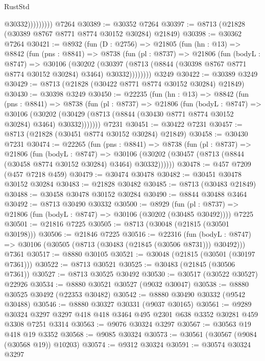 \begin{lexlean}{RustStd}
\begin{coremodule}
                      @30332)))))))))
    @7264
@30389 := @30352 @7264
@30397 := @8713 (@21828 (@30389 @8767 @8771 @8774 @30152 @30284) @21849)
@30398 := @30362 @7264
@30421 := @8932
    (fun (D : @2756) =>
    @21805
      (fun (hn : @13) =>
      @8842
        (fun (pns : @8841) =>
        @8738
          (fun (pl : @8737) =>
          @21806
            (fun (bodyL : @8747) =>
            @30106
              (@30202
                (@30397 (@8713 (@8844 (@30398 @8767 @8771 @8774 @30152 @30284) @3464) @30332))))))))
    @3249
@30422 := @30389 @3249
@30429 := @8713 (@21828 (@30422 @8771 @8774 @30152 @30284) @21849)
@30430 := @30398 @3249
@30450 := @22235
    (fun (hn : @13) =>
    @8842
      (fun (pns : @8841) =>
      @8738
        (fun (pl : @8737) =>
        @21806
          (fun (bodyL : @8747) =>
          @30106
            (@30202 (@30429 (@8713 (@8844 (@30430 @8771 @8774 @30152 @30284) @3464) @30332)))))))
    @7231
@30451 := @30422 @7231
@30457 := @8713 (@21828 (@30451 @8774 @30152 @30284) @21849)
@30458 := @30430 @7231
@30474 := @22265
    (fun (pns : @8841) =>
    @8738
      (fun (pl : @8737) =>
      @21806
        (fun (bodyL : @8747) =>
        @30106 (@30202 (@30457 (@8713 (@8844 (@30458 @8774 @30152 @30284) @3464) @30332))))))
@30478 := @457 @7209 (@457 @7218 @459)
@30479 := @30474 @30478
@30482 := @30451 @30478 @30152 @30284
@30483 := @21828 @30482
@30485 := @8713 (@30483 @21849)
@30488 := @30458 @30478 @30152 @30284
@30490 := @8844 @30488 @3464
@30492 := @8713 @30490 @30332
@30500 := @8929
    (fun (pl : @8737) => @21806 (fun (bodyL : @8747) => @30106 (@30202 (@30485 @30492))))
    @7225
@30501 := @21816 @7225
@30505 := @8713 (@30048 (@21815 (@30501 @30198)))
@30506 := @21846 @7225
@30516 := @22316
    (fun (bodyL : @8747) => @30106 (@30505 (@8713 (@30483 (@21845 (@30506 @8731))) @30492)))
    @7361
@30517 := @8880 @30105
@30521 := @30048 (@21815 (@30501 (@30197 @7361)))
@30522 := @8713 @30521
@30525 := @30483 (@21845 (@30506 @7361))
@30527 := @8713 @30525 @30492
@30530 := @30517 (@30522 @30527) @22926
@30534 := @8880 @30521 @30527 (@9032 @30047)
@30538 := @8880 @30525 @30492 (@22353 @30482)
@30542 := @8880 @30490 @30332 (@9542 @30488)
@30546 := @8880 @30327 @30331 (@9037 @30165)
@30561 := @9289
    @30324
    @3297
    @3297
    @418
    @418
    @3464
    @495
    @2301
    @638
    @3352
    @30281
    @459
    @3308
    @7251
    @3314
@30563 := @9076 @30324 @3297
@30567 := @30563 @19 @418 @19 @3352
@30568 := @9085 @30324
@30573 := @30561 (@30567 (@9084 (@30568 @19)) @10203)
@30574 := @9312 @30324
@30591 := @30574
    @30324
    @3297

\end{coremodule}
\end{lexlean}

